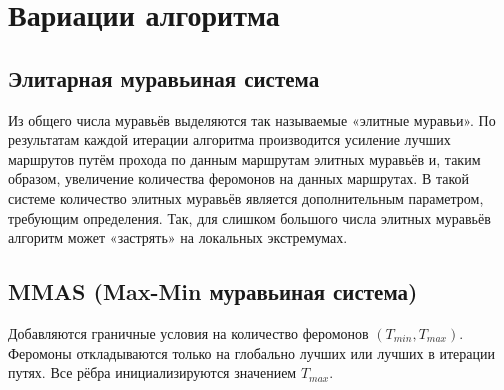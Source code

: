 \documentclass{book}
\begin{document}
\section*{Вариации алгоритма}
\subsection*{Элитарная муравьиная система}
Из общего числа муравьёв выделяются так называемые «элитные муравьи». По результатам каждой итерации алгоритма производится усиление лучших маршрутов путём прохода по данным маршрутам элитных муравьёв и, таким образом, увеличение количества феромонов на данных маршрутах. В такой системе количество элитных муравьёв является дополнительным параметром, требующим определения. Так, для слишком большого числа элитных муравьёв алгоритм может «застрять» на локальных экстремумах.
\subsection*{MMAS (Max-Min муравьиная система)}

Добавляются граничные условия на количество феромонов $(T_{min},T_{max})$. Феромоны откладываются только на глобально лучших или лучших в итерации путях. Все рёбра инициализируются значением $T_{max}$.
\end{document}

